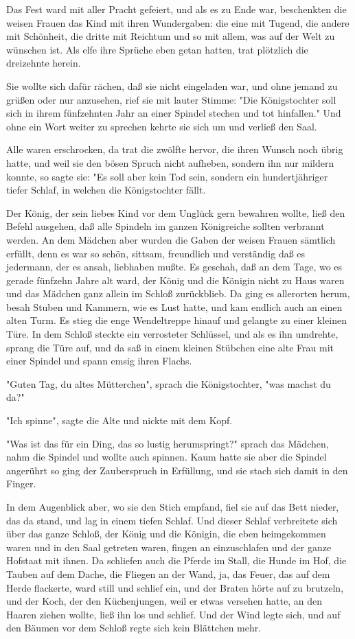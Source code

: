 \documentclass[11pt,a4paper]{CLabBookTemplate} %
\begin{document}
Das Fest ward mit aller Pracht gefeiert, und als es zu Ende war, beschenkten die weisen Frauen das Kind mit ihren Wundergaben: die eine mit Tugend, die andere mit Schönheit, die dritte mit Reichtum und so mit allem, was auf der Welt zu wünschen ist. Als elfe ihre Sprüche eben getan hatten, trat plötzlich die dreizehnte herein.

Sie wollte sich dafür rächen, daß sie nicht eingeladen war, und ohne jemand zu grüßen oder nur anzusehen, rief sie mit lauter Stimme: "Die Königstochter soll sich in ihrem fünfzehnten Jahr an einer Spindel stechen und tot hinfallen." Und ohne ein Wort weiter zu sprechen kehrte sie sich um und verließ den Saal.

Alle waren erschrocken, da trat die zwölfte hervor, die ihren Wunsch noch übrig hatte, und weil sie den bösen Spruch nicht aufheben, sondern ihn nur mildern konnte, so sagte sie: "Es soll aber kein Tod sein, sondern ein hundertjähriger tiefer Schlaf, in welchen die Königstochter fällt.

Der König, der sein liebes Kind vor dem Unglück gern bewahren wollte, ließ den Befehl ausgehen, daß alle Spindeln im ganzen Königreiche sollten verbrannt werden. An dem Mädchen aber wurden die Gaben der weisen Frauen sämtlich erfüllt, denn es war so schön, sittsam, freundlich und verständig daß es jedermann, der es ansah, liebhaben mußte. Es geschah, daß an dem Tage, wo es gerade fünfzehn Jahre alt ward, der König und die Königin nicht zu Haus waren und das Mädchen ganz allein im Schloß zurückblieb. Da ging es allerorten herum, besah Stuben und Kammern, wie es Lust hatte, und kam endlich auch an einen alten Turm. Es stieg die enge Wendeltreppe hinauf und gelangte zu einer kleinen Türe. In dem Schloß steckte ein verrosteter Schlüssel, und als es ihn umdrehte, sprang die Türe auf, und da saß in einem kleinen Stübchen eine alte Frau mit einer Spindel und spann emsig ihren Flachs.

"Guten Tag, du altes Mütterchen", sprach die Königstochter, "was machst du da?"

"Ich spinne", sagte die Alte und nickte mit dem Kopf.

"Was ist das für ein Ding, das so lustig herumspringt?" sprach das Mädchen, nahm die Spindel und wollte auch spinnen. Kaum hatte sie aber die Spindel angerührt so ging der Zauberspruch in Erfüllung, und sie stach sich damit in den Finger.

In dem Augenblick aber, wo sie den Stich empfand, fiel sie auf das Bett nieder, das da stand, und lag in einem tiefen Schlaf. Und dieser Schlaf verbreitete sich über das ganze Schloß, der König und die Königin, die eben heimgekommen waren und in den Saal getreten waren, fingen an einzuschlafen und der ganze Hofstaat mit ihnen. Da schliefen auch die Pferde im Stall, die Hunde im Hof, die Tauben auf dem Dache, die Fliegen an der Wand, ja, das Feuer, das auf dem Herde flackerte, ward still und schlief ein, und der Braten hörte auf zu brutzeln, und der Koch, der den Küchenjungen, weil er etwas versehen hatte, an den Haaren ziehen wollte, ließ ihn los und schlief. Und der Wind legte sich, und auf den Bäumen vor dem Schloß regte sich kein Blättchen mehr.
\end{document}
